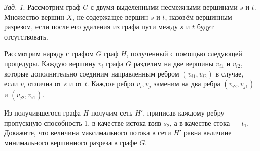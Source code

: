 \documentclass[a4paper,12pt]{article}
\numberwithin{figure}{section}
\theoremstyle{remark}
\newtheorem{problem}{Зад.}[section]
\begin{document}
\begin{problem}
	Рассмотрим граф $G$ с двумя выделенными несмежными вершинами $s$ и $t$. Множество вершин $X$, не содержащее вершин $s$ и $t$, назовём вершинным разрезом, если после его удаления из графа пути между $s$ и $t$ будут отсутствовать.
	
	Рассмотрим наряду с графом $G$ граф $H$, полученный с помощью следующей процедуры. Каждую вершину $v_i$ графа $G$ разделим на две вершины $v_{i1}$ и $v_{i2}$, которые дополнительно соединим направленным ребром $(v_{i1},v_{i2})$ в случае, если $v_i$ отлична от $s$ и от $t$. Каждое ребро ${v_i,v_j}$ заменим на два ребра $(v_{i2},v_{j1})$ и $(v_{j2},v_{i1})$.
	
	Из получившегося графа $H$ получим сеть $H'$, приписав каждому ребру пропускную способность 1, в качестве истока взяв $s_2$, а в качестве стока — $t_1$. Докажите, что величина максимального потока в сети $H'$ равна величине минимального вершинного разреза в графе $G$.
\end{problem}
\end{document}
